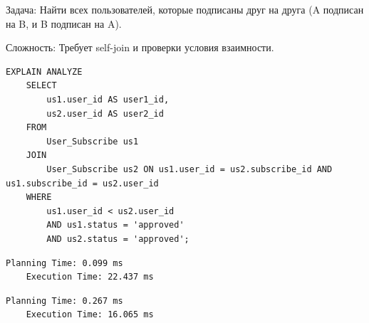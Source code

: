 \documentclass{article}
\begin{document}
Задача: Найти всех пользователей, которые подписаны друг на друга (A подписан на B, и B подписан на A).

Сложность: Требует self-join и проверки условия взаимности.
\begin{lstlisting}[caption={subs}, label={lst:example}]
    EXPLAIN ANALYZE
    SELECT
        us1.user_id AS user1_id,
        us2.user_id AS user2_id
    FROM
        User_Subscribe us1
    JOIN
        User_Subscribe us2 ON us1.user_id = us2.subscribe_id AND us1.subscribe_id = us2.user_id
    WHERE
        us1.user_id < us2.user_id  
        AND us1.status = 'approved'
        AND us2.status = 'approved';
\end{lstlisting}
\begin{lstlisting}[caption={explain analyze without indexes}, label={lst:example}]
    Planning Time: 0.099 ms
    Execution Time: 22.437 ms
\end{lstlisting}
\begin{lstlisting}[caption={explain analyze with indexes}, label={lst:example}]
    Planning Time: 0.267 ms
    Execution Time: 16.065 ms
\end{lstlisting}
\end{document}
